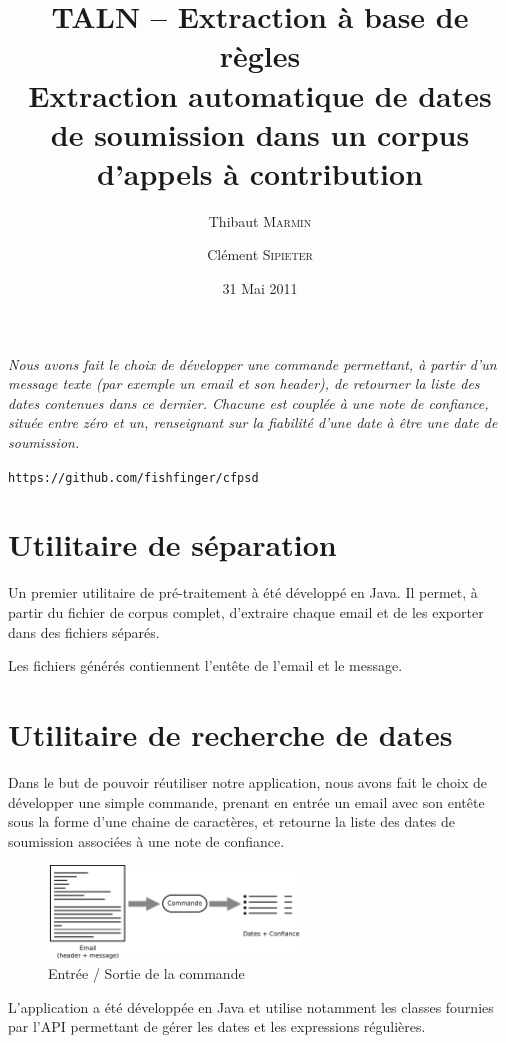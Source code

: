 \documentclass[a4paper,french,10pt]{article}
\title{\textbf{TALN -- Extraction à base de règles\\ \normalsize Extraction automatique de dates de soumission dans un corpus d'appels à contribution}}
\author{Thibaut \textsc{Marmin} \and Clément \textsc{Sipieter}}
\date{31 Mai 2011}
\begin{document}
\maketitle

\emph{Nous avons fait le choix de développer une commande permettant, à partir d'un message texte (par exemple un email et son header), de retourner la liste des dates contenues dans ce dernier. Chacune est couplée à une note de confiance, située entre zéro et un, renseignant sur la fiabilité d'une date à être une date de soumission.}

\begin{center}
\verb+https://github.com/fishfinger/cfpsd+
\end{center}

\section{Utilitaire de séparation}
Un premier utilitaire de pré-traitement à été développé en Java. Il permet, à partir du fichier de corpus complet, d'extraire chaque email et de les exporter dans des fichiers séparés.

Les fichiers générés contiennent l'entête de l'email et le message.

\section{Utilitaire de recherche de dates}
Dans le but de pouvoir réutiliser notre application, nous avons fait le choix de développer une simple commande, prenant en entrée un email avec son entête sous la forme d'une chaine de caractères, et retourne la liste des dates de soumission associées à une note de confiance.

\begin{figure}[H]
\centering
\includegraphics[width=0.6\textwidth]{files/archi}
\caption{Entrée / Sortie de la commande}
\end{figure}

L'application a été développée en Java et utilise notamment les classes fournies par l'API permettant de gérer les dates et les expressions régulières.
\end{document}
